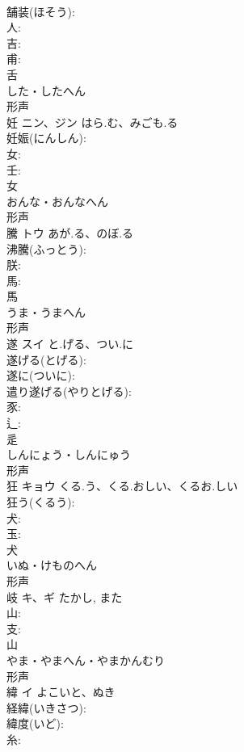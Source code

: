 \documentclass[8pt]{extreport}
\begin{document}
\begin{CJK}{UTF8}{min}
\\	舗装(ほそう): 
\\	人: 
\\	吉: 
\\	甫: 
\\	舌	
\\	した・したへん	
\\	形声 
\\	妊	ニン、ジン	はら.む、みごも.る		
\\	妊娠(にんしん): 
\\	女: 
\\	壬: 
\\	女	
\\	おんな・おんなへん	
\\	形声 
\\	騰	トウ	あが.る、のぼ.る		
\\	沸騰(ふっとう): 
\\	朕: 
\\	馬: 
\\	馬	
\\	うま・うまへん	
\\	形声 
\\	遂	スイ	と.げる、つい.に		
\\	遂げる(とげる): 
\\	遂に(ついに): 
\\	遣り遂げる(やりとげる): 
\\	豕: 
\\	辶: 
\\	辵	
\\	しんにょう・しんにゅう	
\\	形声 
\\	狂	キョウ	くる.う、くる.おしい、くるお.しい		
\\	狂う(くるう): 
\\	犬: 
\\	玉: 
\\	犬	
\\	いぬ・けものへん	
\\	形声 
\\	岐	キ、ギ		たかし, また	
\\	山: 
\\	支: 
\\	山	
\\	やま・やまへん・やまかんむり	
\\	形声 
\\	緯	イ	よこいと、ぬき		
\\	経緯(いきさつ): 
\\	緯度(いど): 
\\	糸: 

\end{CJK}
\end{document}
